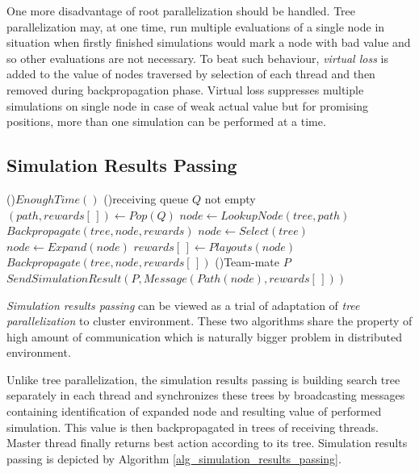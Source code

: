 One more disadvantage of root parallelization should be handled. Tree parallelization may, at
one time, run multiple evaluations of a single node in situation when firstly finished
simulations would mark a node with bad value and so other evaluations are not necessary. To
beat such behaviour, \emph{virtual loss} is added to the value of nodes traversed by selection
of each thread and then removed during backpropagation phase. Virtual loss suppresses multiple
simulations on single node in case of weak actual value but for promising positions, more than
one simulation can be performed at a time.



\subsection{Simulation Results Passing}
\label{sec_simulation_passing}

\begin{algorithm}
\DontPrintSemicolon
\caption{$SimulationResultsPassingLoop(tree)$}
\label{alg_simulation_results_passing}

\While(){$EnoughTime()$}{
    \While(){receiving queue $Q$ not empty}{
        $(path,rewards[\,]) \leftarrow Pop(Q)$ \;
        $node \leftarrow LookupNode(tree,path)$ \;
        $Backpropagate(tree,node,rewards)$ \;
    }
    $node \leftarrow Select(tree)$\;
    $node \leftarrow Expand(node)$\;
    $rewards[\,] \leftarrow Playouts(node)$\;
    $Backpropagate(tree,node,rewards[\,])$ \;
    \ForEach(){Team-mate $P$}{
        $SendSimulationResult(P, Message(Path(node),rewards[\,]))$ \;
    }
}

 \;
\end{algorithm}



\emph{Simulation results passing} can be viewed as a trial of adaptation of \emph{tree
parallelization} to cluster environment. These two algorithms share the property of high amount of
communication which is naturally bigger problem in distributed environment.

Unlike tree parallelization, the simulation results passing is building search tree separately in
each thread and synchronizes these trees by broadcasting messages containing identification of
expanded node and resulting value of performed simulation. This value is then backpropagated in
trees of receiving threads. Master thread finally returns best action according to its tree.
Simulation results passing is depicted by Algorithm \ref{alg_simulation_results_passing}.

